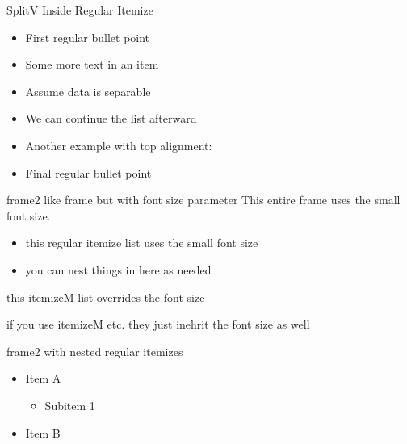 \documentclass[11pt,compress,t,notes=noshow, xcolor=table]{beamer}
\begin{document}
\begin{frame}{SplitV Inside Regular Itemize}
  \begin{itemize}
    \item First regular bullet point
    
    \item Some more text in an item
    
    \item Assume data is separable
    \item We can continue the list afterward
    
    \item Another example with top alignment:
    
    \item Final regular bullet point
  \end{itemize}
\end{frame}


\begin{frame2}[small]{frame2 like frame but with font size parameter}
  This entire frame uses the small font size.
  
  \begin{itemize}
    \item this regular itemize list uses the small font size
    \item you can nest things in here as needed
  \end{itemize}
    \begin{itemizeM}[large]
    \item this itemizeM list overrides the font size
    \item if you use itemizeM etc. they just inehrit the font size as well
  \end{itemizeM}
\end{frame2}


\begin{frame2}[tiny]{frame2 with nested regular itemizes}
  \begin{itemize}
    \item Item A
      \begin{itemize}
        \item Subitem 1
      \end{itemize}
    \item Item B
  \end{itemize}
\end{frame2}


\endlecture
\end{document}
